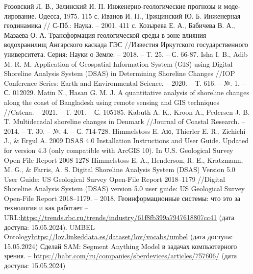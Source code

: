 \documentclass[732,14pt,final]{studrep}
\begin{document}
\begin{thebibliography}{99}
Розовский Л. В., Зелинский И. П. Инженерно-геологические прогнозы и моде­лирование. Одесса, 1975. 115 с.
Иванов И. П., Тржцинский Ю. Б. Инженерная геодинамика // С-Пб.: Наука. – 2001. 411 с.
Козырева Е. А., Бабичева В. А., Мазаева О. А. Трансформация геологической среды в зоне влияния водохранилищ Ангарского каскада ГЭС //Известия Иркутского государственного университета. Серия: Науки о Земле. – 2018. – Т. 25. – С. 66-87.
Isha I. B., Adib M. R. M. Application of Geospatial Information System (GIS) using Digital Shoreline Analysis System (DSAS) in Determining Shoreline Changes //IOP Conference Series: Earth and Environmental Science. – 2020. – Т. 616. – №. 1. – С. 012029.
Matin N., Hasan G. M. J. A quantitative analysis of shoreline changes along the coast of Bangladesh using remote sensing and GIS techniques //Catena. – 2021. – Т. 201. – С. 105185.
Kabuth A. K., Kroon A., Pedersen J. B. T. Multidecadal shoreline changes in Denmark //Journal of Coastal Research. – 2014. – Т. 30. – №. 4. – С. 714-728.
 Himmelstoss E. Aю, Thierler E. R., Zichichi J., \& Ergul A. 2009 DSAS 4.0 Installation Instructions and User Guide. Updated for version 4.3 (only compatible with ArcGIS 10). In U.S. Geological Survey Open-File Report 2008-1278
 Himmelstoss E. A., Henderson, R. E., Kratzmann, M. G., \& Farris, A. S. Digital Shoreline Analysis System (DSAS) Version 5.0 User Guide: US Geological Survey Open-File Report 2018–1179 //Digital Shoreline Analysis System (DSAS) version 5.0 user guide: US Geological Survey Open-File Report 2018–1179. – 2018.
 Геоинформационные системы: что это за технология и как работает -- URL:\url{https://trends.rbc.ru/trends/industry/61f8fb399a7947618807cc41} (дата доступа: 15.05.2024).
 UMBEL Ontology\url{https://lov.linkeddata.es/dataset/lov/vocabs/umbel} (дата доступа: 15.05.2024)
 Сделай SAM: Segment Anything Model в задачах компьютерного зрения. -- \url{https://habr.com/ru/companies/sberdevices/articles/757606/} (дата доступа: 15.05.2024)
\end{thebibliography}
\appendix
\end{document}
